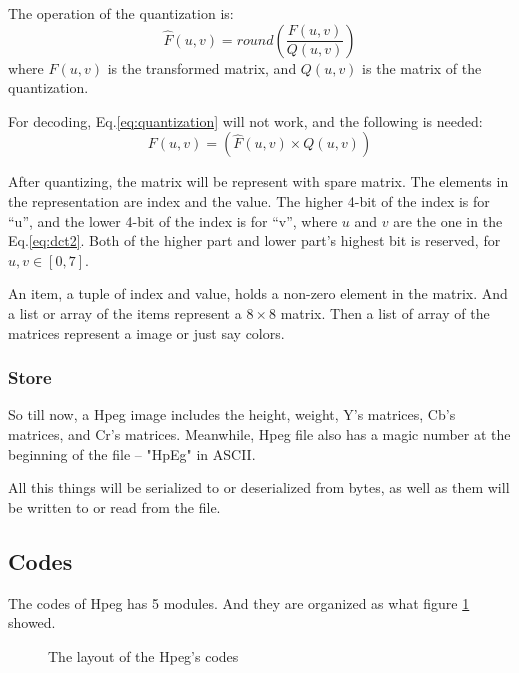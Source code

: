 \documentclass{article}
\begin{document}
The operation of the quantization is:
\begin{equation}
\label{eq:quantization}
\widehat{F}(u,v) = round\left(\frac{F(u,v)}{Q(u,v)}\right)
\end{equation}
where $F(u,v)$ is the transformed matrix, and $Q(u,v)$ is the matrix of the quantization.

For decoding, Eq.\ref{eq:quantization} will not work, and the following is needed:
\begin{equation}
\label{eq:iquantization}
F(u,v) = \left(\widehat{F}(u,v) \times Q(u,v)\right)
\end{equation}

After quantizing, the matrix will be represent with spare matrix.
The elements in the representation are index and the value. The higher 4-bit of the index is for ``u'',
and the lower 4-bit of the index is for ``v'', where $u$ and $v$ are the one in the Eq.\ref{eq:dct2}.
Both of the higher part and lower part's highest bit is reserved, for $u,v \in \left[0,7\right]$.

An item, a tuple of index and value, holds a non-zero element in the matrix.
And a list or array of the items represent a $8 \times 8$ matrix.
Then a list of array of the matrices represent a image or just say colors.

\subsubsection{Store}
\label{sec:hpeg:inside:store}

So till now, a Hpeg image includes the height, weight, Y's matrices, Cb's matrices, and Cr's matrices.
Meanwhile, Hpeg file also has a magic number at the beginning of the file -- "HpEg" in ASCII.

All this things will be serialized to or deserialized from bytes, as well as them will be written to or
read from the file.

\subsection{Codes}
\label{sec:hpeg:codes}

The codes of Hpeg has 5 modules. And they are organized as what figure \ref{fig:hpeg:layout} showed.

\begin{figure}
    \centering
    \caption{The layout of the Hpeg's codes}
    \label{fig:hpeg:layout}
\end{figure}
\end{document}

